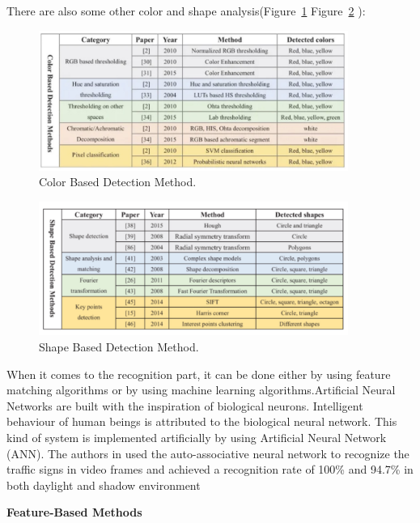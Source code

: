 \documentclass[letterpaper, 10 pt, conference]{ieeeconf}
\begin{document}
There are also some other color and shape analysis(Figure~\ref{fig:color_based_method} Figure~\ref{fig:shape_based_method} \cite{liu2019machine}):

\begin{figure}[!t]
    \centering
    \includegraphics[width=0.9\textwidth]{figures/color_based_method.jpg} 
    \caption{Color Based Detection Method.}
    \label{fig:color_based_method}
\end{figure}

\begin{figure}[!t]
    \centering
    \includegraphics[width=0.9\textwidth]{figures/shape_based_method.jpg} 
    \caption{Shape Based Detection Method.}
    \label{fig:shape_based_method}
\end{figure}

When it comes to the recognition part, it can be done either by using feature matching algorithms or by using machine learning algorithms.Artificial Neural Networks are built with the inspiration of biological neurons. Intelligent behaviour of human beings is attributed to the biological neural network. This kind of system is implemented artificially by using Artificial Neural Network (ANN). The authors \cite{Supreeth2016} in used the auto-associative neural network to recognize the traffic signs in video frames and achieved a recognition rate of 100\% and 94.7\% in both daylight and shadow environment

\textbf{Feature-Based Methods}
\end{document}
